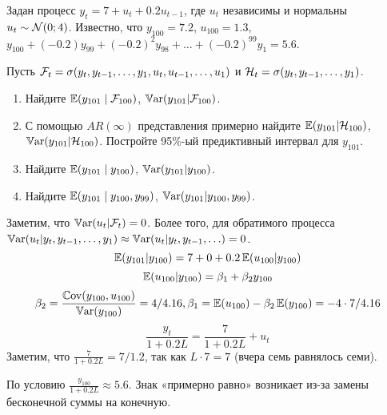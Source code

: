 \begin{problem}
Задан процесс $y_t = 7 + u_t + 0.2 u_{t-1}$, где $u_t$ независимы и нормальны $u_t \sim \mathcal{N}(0;4)$. 
Известно, что $y_{100}=7.2$, $u_{100}=1.3$, $y_{100}+(-0.2)y_{99}+(-0.2)^2y_{98}+\ldots+(-0.2)^{99}y_1=5.6$.

Пусть $\mathcal{F}_t=\sigma(y_t, y_{t-1}, \ldots, y_1, u_t, u_{t-1}, \ldots, u_1)$ и $\mathcal{H}_t = \sigma(y_t, y_{t-1}, \ldots, y_1)$.
\begin{enumerate}
  \item Найдите $\operatorname{\mathbb{E}}(y_{101} \mid \mathcal{F}_{100})$, $\operatorname{\mathbb{V}\mathrm{ar}}(y_{101}|\mathcal{F}_{100})$.
  \item С помощью $AR(\infty)$ представления примерно найдите $\operatorname{\mathbb{E}}(y_{101}|\mathcal{H}_{100})$, $\operatorname{\mathbb{V}\mathrm{ar}}(y_{101}|\mathcal{H}_{100})$. 
  Постройте 95\%-ый предиктивный интервал для $y_{101}$.
  \item Найдите $\operatorname{\mathbb{E}}(y_{101} \mid y_{100})$, $\operatorname{\mathbb{V}\mathrm{ar}}(y_{101}|y_{100})$.
  \item Найдите $\operatorname{\mathbb{E}}(y_{101} \mid y_{100}, y_{99})$, $\operatorname{\mathbb{V}\mathrm{ar}}(y_{101}|y_{100}, y_{99})$.
\end{enumerate}

\begin{sol}
Заметим, что $\operatorname{\mathbb{V}\mathrm{ar}}(u_t|\mathcal{F}_t)=0$. Более того, для обратимого процесса $\operatorname{\mathbb{V}\mathrm{ar}}(u_t|y_t, y_{t-1}, \ldots, y_1) \approx \operatorname{\mathbb{V}\mathrm{ar}}(u_t|y_t, y_{t-1}, \ldots) = 0$.
\[
\operatorname{\mathbb{E}}(y_{101}|y_{100})=7 + 0 + 0.2\operatorname{\mathbb{E}}(u_{100}|y_{100})
\]
\[
\operatorname{\mathbb{E}}(u_{100}|y_{100}) = \beta_1 + \beta_2 y_{100}
\]
\[
\beta_2 = \frac{\operatorname{\mathbb{C}\mathrm{ov}}(y_{100}, u_{100})}{\operatorname{\mathbb{V}\mathrm{ar}}(y_{100})}=4/4.16, \beta_1 = \operatorname{\mathbb{E}}(u_{100}) - \beta_2 \operatorname{\mathbb{E}}(y_{100})=-4\cdot 7/4.16
\]
\[
\frac{y_t}{1+0.2L} = \frac{7}{1+0.2L} + u_t
\]
Заметим, что $\frac{7}{1+0.2L}=7/1.2$, так как $L\cdot 7 = 7$ (вчера семь равнялось семи).

По условию $\frac{y_{100}}{1+0.2L} \approx 5.6$. Знак «примерно равно» возникает из-за замены бесконечной суммы на конечную.

\end{sol}
\end{problem}



